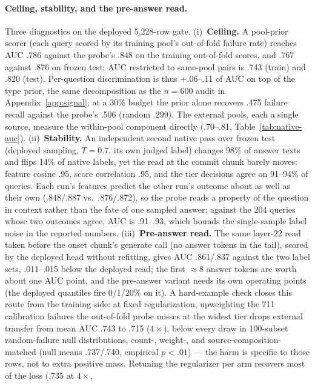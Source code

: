 \paragraph{Ceiling, stability, and the pre-answer read.} Three
diagnostics on the deployed 5{,}228-row gate. (i)~\textbf{Ceiling.} A
pool-prior scorer (each query scored by its training pool's
out-of-fold failure rate) reaches AUC .786 against the probe's .848 on
the training out-of-fold scores, and .767 against .876 on frozen
test; AUC restricted to same-pool pairs is .743 (train) and .820
(test). Per-question discrimination is thus $+$.06--.11 of AUC on
top of the type prior, the same decomposition as the $n{=}600$ audit
in Appendix~\ref{app:signal}; at a 30\% budget the prior alone recovers
.475 failure recall against the probe's .506 (random .299). The
external pools, each a single source, measure the within-pool
component directly (.70--.81, Table~\ref{tab:native-auc}).
(ii)~\textbf{Stability.} An independent second native pass over frozen
test (deployed sampling, $T{=}0.7$, its own judged label) changes 98\%
of answer texts and flips 14\% of native labels, yet the read at the
commit chunk barely moves: feature cosine .95, score correlation .95,
and the tier decisions agree on 91--94\% of queries. Each run's
features predict the other run's outcome about as well as
their own (.848/.887 vs.\ .876/.872), so the probe reads a property
of the question in context rather than the fate of one sampled
answer; against the 204 queries whose two outcomes agree, AUC is
.91--.93, which bounds the single-sample label noise in the reported
numbers. (iii)~\textbf{Pre-answer read.} The same layer-22 read taken
before the onset chunk's generate call (no answer tokens in the tail),
scored by the deployed head without refitting, gives AUC .861/.837
against the two label sets, .011--.015 below the deployed read; the
first $\approx$8 answer tokens are worth about one AUC point, and the
pre-answer variant needs its own operating points (the deployed
quantiles fire 0/1/20\% on it). A hard-example check closes this
route from the training side: at fixed regularization, upweighting
the 711 calibration failures the out-of-fold probe misses at the
widest tier drops external transfer from mean AUC .743 to .715
($4{\times}$), below every draw in 100-subset random-failure null
distributions, count-, weight-, and source-composition-matched
(null means .737/.740, empirical $p<.01$) --- the harm is specific
to those rows, not to extra positive mass. Retuning the
regularizer per arm recovers most of the loss (.735 at $4{\times}$,
